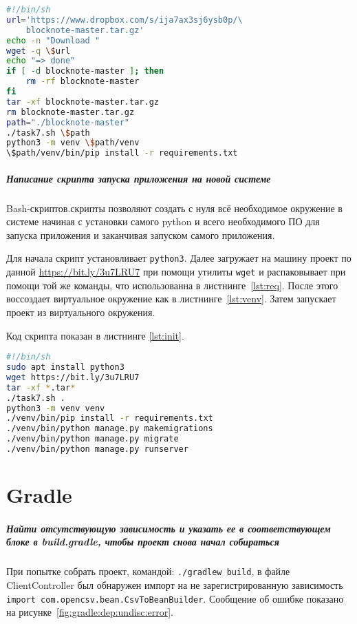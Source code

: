 \begin{lstlisting}[language=Bash
	, caption=\leftline{Создание виртуального окружения}
	, label=lst:venv]
#!/bin/sh
url='https://www.dropbox.com/s/ija7ax3sj6ysb0p/\
	blocknote-master.tar.gz'
echo -n "Download "
wget -q \$url
echo "=> done"
if [ -d blocknote-master ]; then
	rm -rf blocknote-master
fi
tar -xf blocknote-master.tar.gz
rm blocknote-master.tar.gz
path="./blocknote-master"
./task7.sh \$path
python3 -m venv \$path/venv
\$path/venv/bin/pip install -r requirements.txt
\end{lstlisting}

\paragraph{Написание скрипта запуска приложения на новой системе}\mbox{}\par
Bash-скриптов.скрипты позволяют создать с нуля всё необходимое окружение в
системе начиная с установки самого python и всего необходимого ПО для
запуска приложения и заканчивая запуском самого приложения.\par
Для начала скрипт установливает \texttt{python3}.
Далее загружает на машину проект по данной \url{https://bit.ly/3u7LRU7}
при помощи утилиты \texttt{wget} и распаковывает при помощи той же команды,
что использованна в листнинге~\ref{lst:req}.
После этого воссоздает виртуальное окружение как в листнинге~\ref{lst:venv}.
Затем запускает проект из виртуального окружения.\par
Код скрипта показан в листнинге \ref{lst:init}.

\begin{lstlisting}[language=Bash
	, caption=\leftline{Создание стартового скрипта}
	, label=lst:init]
#!/bin/sh
sudo apt install python3
wget https://bit.ly/3u7LRU7
tar -xf *.tar*
./task7.sh .
python3 -m venv venv
./venv/bin/pip install -r requirements.txt
./venv/bin/python manage.py makemigrations
./venv/bin/python manage.py migrate
./venv/bin/python manage.py runserver
\end{lstlisting}

\chapter{Gradle}
\paragraph{Найти отсутствующую зависимость и указать ее в соответствующем
блоке в build.gradle, чтобы проект снова начал собираться}\mbox{}\par
При попытке собрать проект, командой: \texttt{./gradlew~build},
в файле ClientController был обнаружен импорт на не зарегистрированную
зависимость \texttt{import~com.opencsv.bean.CsvToBeanBuilder}.
Сообщение об ошибке показано на рисунке~\ref{fig:gradle:dep:undisc:error}.

